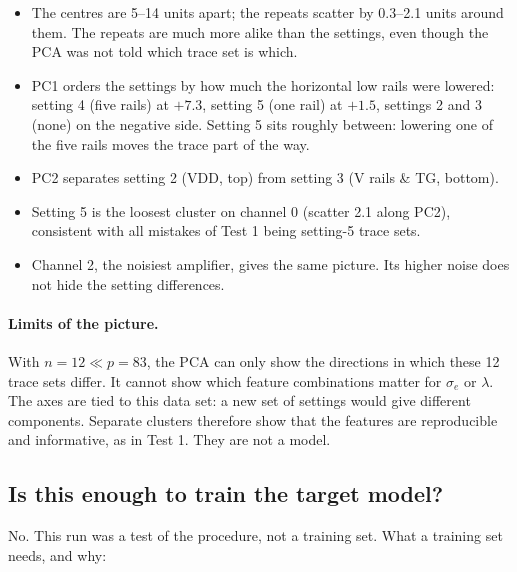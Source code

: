 \documentclass[10pt]{article}
\begin{document}
\begin{itemize}
\item The centres are 5--14 units apart; the repeats scatter by 0.3--2.1 units around them. The repeats are much more alike
  than the settings, even though the PCA was not told which trace set is which.
\item PC1 orders the settings by how much the horizontal low rails were lowered: setting 4 (five rails) at $+7.3$, setting 5
  (one rail) at $+1.5$, settings 2 and 3 (none) on the negative side. Setting 5 sits roughly between: lowering one of the
  five rails moves the trace part of the way.
\item PC2 separates setting 2 (VDD, top) from setting 3 (V rails \& TG, bottom).
\item Setting 5 is the loosest cluster on channel 0 (scatter 2.1 along PC2), consistent with all mistakes of Test 1 being
  setting-5 trace sets.
\item Channel 2, the noisiest amplifier, gives the same picture. Its higher noise does not hide the setting differences.
\end{itemize}

\paragraph{Limits of the picture.} With $n = 12 \ll p = 83$, the PCA can only show the directions in which these 12 trace
sets differ. It cannot show which feature combinations matter for $\sigma_e$ or $\lambda$. The axes are tied to this data
set: a new set of settings would give different components. Separate clusters therefore show that the features are
reproducible and informative, as in Test 1. They are not a model.

\subsection{Is this enough to train the target model?}
\label{sec:ml-target}

No. This run was a test of the procedure, not a training set. What a training set needs, and why:
\end{document}
